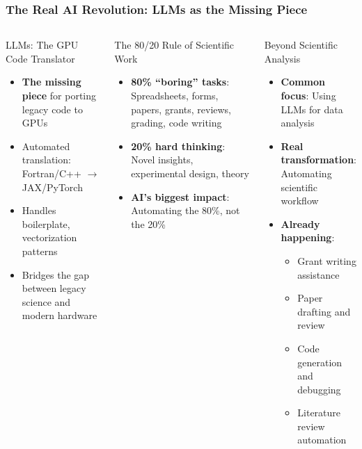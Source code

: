 \documentclass[aspectratio=169]{beamer}
\begin{document}
\begin{frame}
    \frametitle{The Real AI Revolution: LLMs as the Missing Piece}
    \begin{columns}
        \begin{block}{LLMs: The GPU Code Translator}
            \begin{itemize}
                \item \textbf{The missing piece} for porting legacy code to GPUs
                \item Automated translation: Fortran/C++ $\rightarrow$ JAX/PyTorch
                \item Handles boilerplate, vectorization patterns
                \item Bridges the gap between legacy science and modern hardware
            \end{itemize}
        \end{block}
        \begin{block}{The 80/20 Rule of Scientific Work}
            \begin{itemize}
                \item \textbf{80\% ``boring'' tasks}: Spreadsheets, forms, papers, grants, reviews, grading, code writing
                \item \textbf{20\% hard thinking}: Novel insights, experimental design, theory
                \item \textbf{AI's biggest impact}: Automating the 80\%, not the 20\%
            \end{itemize}
        \end{block}
        \begin{block}{Beyond Scientific Analysis}
            \begin{itemize}
                \item \textbf{Common focus}: Using LLMs for data analysis
                \item \textbf{Real transformation}: Automating scientific workflow
                \item \textbf{Already happening}:
                    \begin{itemize}
                        \item Grant writing assistance
                        \item Paper drafting and review
                        \item Code generation and debugging
                        \item Literature review automation

\end{itemize}
\end{itemize}
\end{block}
\end{columns}
\end{frame}
\end{document}
